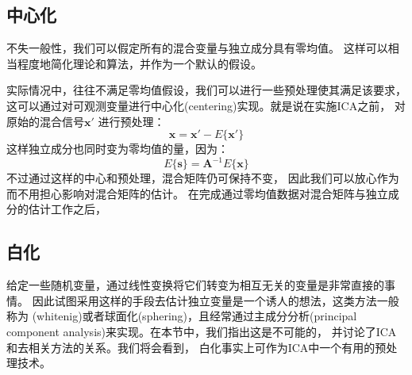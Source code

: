 \subsection{中心化}
不失一般性，我们可以假定所有的混合变量与独立成分具有零均值。
这样可以相当程度地简化理论和算法，并作为一个默认的假设。

实际情况中，往往不满足零均值假设，我们可以进行一些预处理使其满足该要求，
这可以通过对可观测变量进行中心化(centering)实现。就是说在实施ICA之前，
对原始的混合信号$\bm{x'}$
进行预处理：
\begin{equation} 
\bm{x=x'}-E\{\bm{x'}\}
\end{equation}
这样独立成分也同时变为零均值的量，因为：
\begin{equation}
E\{\bm{s}\}=\bm{A}^{-1}E\{\bm{x}\}
\end{equation}
不过通过这样的中心和预处理，混合矩阵仍可保持不变，
因此我们可以放心作为而不用担心影响对混合矩阵的估计。
在完成通过零均值数据对混合矩阵与独立成分的估计工作之后，
    
\subsection{白化}
给定一些随机变量，通过线性变换将它们转变为相互无关的变量是非常直接的事情。
因此试图采用这样的手段去估计独立变量是一个诱人的想法，这类方法一般称为
(whitenig)或者球面化(sphering)，且经常通过主成分分析(principal component analysis)来实现。在本节中，我们指出这是不可能的，
并讨论了ICA和去相关方法的关系。我们将会看到，
白化事实上可作为ICA中一个有用的预处理技术。

